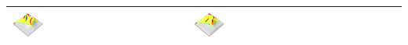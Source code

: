 \documentclass[prodmode,acmtochi]{acmsmall} %
\begin{document}
\begin{table}
{\begin{tabular}{m{} m{} m{} m{} m{}}
\includegraphics[width=0.19\textwidth]{images/render_3d/students/mean_forms_2.png} &
\includegraphics[width=0.19\textwidth]{images/render_3d/students/mean_forms_3.png}\\
%
\bottomrule
\end{tabular}}
\label{table:students} 

\vspace*{1.5em}


\end{table}
\end{document}
